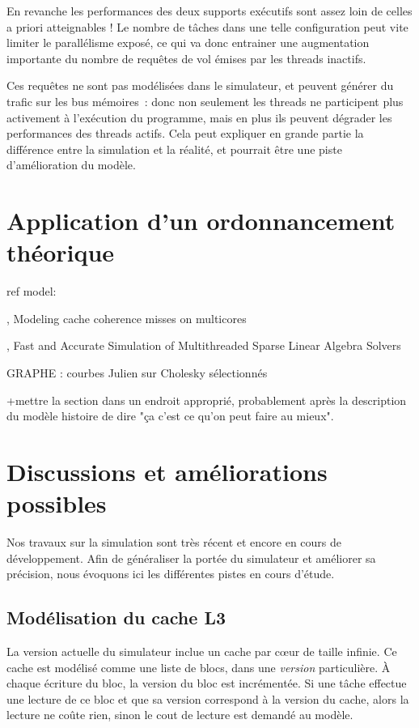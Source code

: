 En revanche les performances des deux supports exécutifs sont assez loin de celles a priori atteignables !
Le nombre de tâches dans une telle configuration peut vite limiter le parallélisme exposé, ce qui va donc entrainer une augmentation importante du nombre de requêtes de vol émises par les threads inactifs.

Ces requêtes ne sont pas modélisées dans le simulateur, et peuvent générer du trafic sur les bus mémoires~: donc non seulement les threads ne participent plus activement à l'exécution du programme, mais en plus ils peuvent dégrader les performances des threads actifs.
Cela peut expliquer en grande partie la différence entre la simulation et la réalité, et pourrait être une piste d'amélioration du modèle.


\section{Application d'un ordonnancement théorique}\label{sec:simulation:theorie}

ref model:

\cite{Pan2014}, Modeling cache coherence misses on multicores

\cite{Stanisic2016}, Fast and Accurate Simulation of Multithreaded Sparse Linear Algebra Solvers

\begin{todo}
GRAPHE : courbes Julien sur Cholesky sélectionnés

+mettre la section dans un endroit approprié, probablement après la description du modèle histoire de dire "ça c'est ce qu'on peut faire au mieux".
\end{todo}

\section{Discussions et améliorations possibles}\label{sec:simulation:next}

Nos travaux sur la simulation sont très récent et encore en cours de développement.
Afin de généraliser la portée du simulateur et améliorer sa précision, nous évoquons ici les différentes pistes en cours d'étude.

\subsection{Modélisation du cache L3}

La version actuelle du simulateur inclue un cache par cœur de taille infinie.
Ce cache est modélisé comme une liste de blocs, dans une \emph{version} particulière.
À chaque écriture du bloc, la version du bloc est incrémentée.
Si une tâche effectue une lecture de ce bloc et que sa version correspond à la version du cache, alors la lecture ne coûte rien, sinon le cout de lecture est demandé au modèle.

